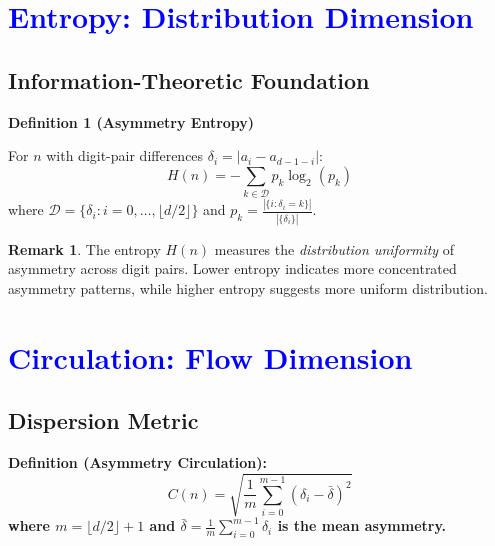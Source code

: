 \documentclass[11pt,a4paper]{article}
\theoremstyle{plain}
\theoremstyle{definition}
\newtheorem{remark}[theorem]{Remark}
\newenvironment{definitionbox}
    {\begin{center}\begin{minipage}{0.95\textwidth}\color{blue}\bfseries}
    {\end{minipage}\end{center}}
\begin{document}
\section{\textcolor{blue}{Entropy: Distribution Dimension}}

\subsection{Information-Theoretic Foundation}

\begin{definitionbox}
\textbf{Definition 1 (Asymmetry Entropy)}\label{def:asymmetry_entropy}

For $n$ with digit-pair differences $\delta_i = |a_i - a_{d-1-i}|$:
\[
H(n) = -\sum_{k \in \mathcal{D}} p_k \log_2(p_k)
\]
where $\mathcal{D} = \{\delta_i : i = 0, \ldots, \lfloor d/2 \rfloor\}$ and $p_k = \frac{|\{i : \delta_i = k\}|}{|\{\delta_i\}|}$.
\end{definitionbox}

\begin{remark}
The entropy $H(n)$ measures the \emph{distribution uniformity} of asymmetry across digit pairs. Lower entropy indicates more concentrated asymmetry patterns, while higher entropy suggests more uniform distribution.
\end{remark}

\section{\textcolor{blue}{Circulation: Flow Dimension}}

\subsection{Dispersion Metric}

\begin{definitionbox}
\textbf{Definition (Asymmetry Circulation):}
\[C(n) = \sqrt{\frac{1}{m}\sum_{i=0}^{m-1} (\delta_i - \bar{\delta})^2}\]
where $m = \lfloor d/2 \rfloor + 1$ and $\bar{\delta} = \frac{1}{m}\sum_{i=0}^{m-1} \delta_i$ is the mean asymmetry.
\end{definitionbox}
\end{document}
